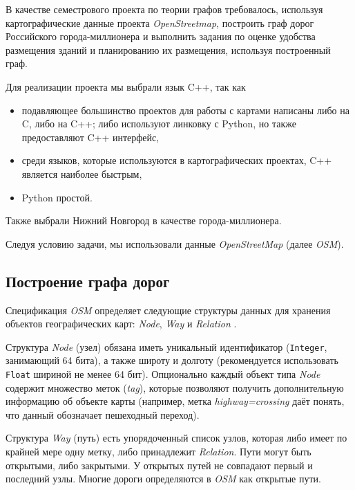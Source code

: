 \documentclass[11pt]{article}
\begin{document}
    В качестве семестрового проекта по теории графов требовалось, используя картографические данные проекта \textit{OpenStreetmap}, построить граф дорог Российского города-миллионера и выполнить задания по оценке удобства размещения зданий и планированию их размещения, используя построенный граф.
    
    Для реализации проекта мы выбрали язык C++, так как
    \begin{itemize}
    \item подавляющее большинство проектов для работы с картами написаны либо на C, либо на C++; либо используют линковку с Python, но также предоставляют C++ интерфейс,
    \item среди языков, которые используются в картографических проектах, C++ является наиболее быстрым,
    \item Python простой.
    \end{itemize}
    
    Также выбрали Нижний Новгород в качестве города-миллионера.
    
    Следуя условию задачи, мы использовали данные \textit{OpenStreetMap} (далее \textit{OSM}).
    
    \subsection{Построение графа дорог}
    
	Спецификация \textit{OSM} \cite{osm-main} определяет следующие структуры данных для хранения объектов географических карт: \textit{Node}, \textit{Way} и \textit{Relation} \cite{osm-wiki}.
	
	Структура \textit{Node} (узел) \cite{osm-node} обязана иметь уникальный идентификатор (\texttt{Integer}, занимающий 64 бита), а также широту и долготу (рекомендуется использовать \texttt{Float} шириной не менее 64 бит).
	Опционально каждый объект типа \textit{Node} содержит множество меток (\textit{tag}), которые позволяют получить дополнительную информацию об объекте карты (например, метка \textit{highway=crossing} даёт понять, что данный обозначает пешеходный переход).

	Структура \textit{Way} (путь) \cite{osm-way} есть упорядоченный список узлов, которая либо имеет по крайней мере одну метку, либо принадлежит \textit{Relation}.
    	Пути могут быть открытыми, либо закрытыми.
    	У открытых путей не совпадают первый и последний узлы.
    	Многие дороги определяются в \textit{OSM} как открытые пути.
    	
\end{document}
